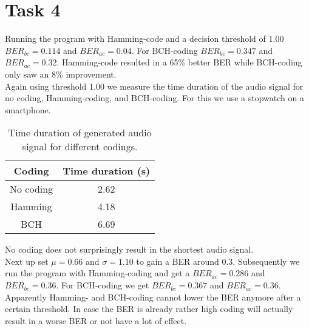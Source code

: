 \documentclass[final]{scrreprt} %
\begin{document}
\section{Task 4}
Running the program with Hamming-code and a decision threshold of  1.00 $BER_{bc} = 0.114$ and $BER_{ac} = 0.04$.
For BCH-coding $BER_{bc} = 0.347$ and $BER_{ac} = 0.32$. Hamming-code resulted in a 65\% better BER while BCH-coding only saw an 8\% improvement.\\
Again using threshold 1.00 we measure the time duration of the audio signal for no coding, Hamming-coding, and BCH-coding. For this we use a stopwatch on a smartphone.

\begin{table}[H]
\centering
\begin{tabular}{| c | c |}
\hline
Coding & Time duration (s)\\
\hline
No coding & 2.62\\
\hline
Hamming & 4.18\\
\hline
BCH & 6.69\\
\hline
\end{tabular}
\caption{Time duration of generated audio signal for different codings.}
\end{table}

No coding does not surprisingly result in the shortest audio signal. \\
Next up set $\mu = 0.66$ and $\sigma = 1.10$ to gain a BER around 0.3. Subsequently we run the program with Hamming-coding and get a $BER_{ac} = 0.286$ and $BER_{bc} = 0.36$. For BCH-coding we get $BER_{bc} =   0.367$ and $BER_{ac} = 0.36$. Apparently Hamming- and BCH-coding cannot lower the BER anymore after a certain threshold. In case the BER is already rather high coding will actually result in a worse BER or not have a lot of effect.
\end{document}
